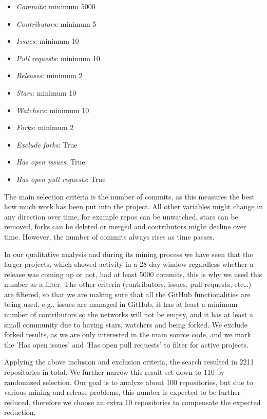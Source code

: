 \begin{itemize}
    \item \textit{Commits}: minimum 5000
    \item \textit{Contributors}: minimum 5
    \item \textit{Issues}: minimum 10
    \item \textit{Pull requests}: minimum 10
    \item \textit{Releases}: minimum 2
    \item \textit{Stars}: minimum 10
    \item \textit{Watchers}: minimum 10
    \item \textit{Forks}: minimum 2
    \item \textit{Exclude forks}: True
    \item \textit{Has open issues}: True
    \item \textit{Has open pull requests}: True
\end{itemize}

The main selection criteria is the number of commits, as this measures the best how much work has been put into the project. All other variables might change in any direction over time, for example repos can be unwatched, stars can be removed, forks can be deleted or merged and contributors might decline over time. However, the number of commits always rises as time passes.

In our qualitative analysis and during its mining process we have seen that the larger projects, which showed activity in a 28-day window regardless whether a release was coming up or not, had at least 5000 commits, this is why we used this number as a filter. The other criteria (contributors, issues, pull requests, etc\dots) are filtered, so that we are making sure that all the GitHub functionalities are being used, e.g., issues are managed in GitHub, it has at least a minimum number of contributors so the networks will not be empty, and it has at least a small community due to having stars, watchers and being forked. We exclude forked results, as we are only interested in the main source code, and we mark the 'Has open issues' and 'Has open pull requests' to filter for active projects.

Applying the above inclusion and exclusion criteria, the search resulted in 2211 repositories in total. We further narrow this result set down to 110 by randomized selection. Our goal is to analyze about 100 repositories, but due to various mining and release problems, this number is expected to be further reduced, therefore we choose an extra 10 repositories to compensate the expected reduction.

